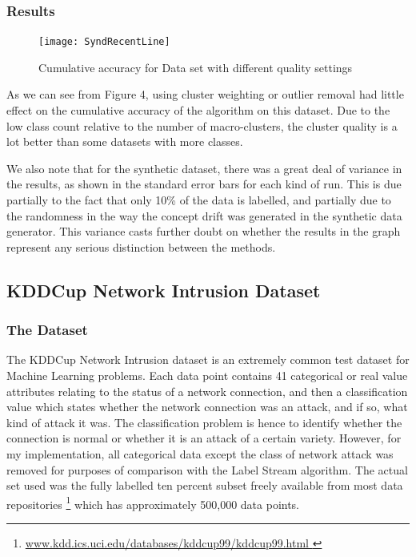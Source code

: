 \documentclass[12pt,a4paper,oneside]{report}
\begin{document}
\subsubsection*{Results}
\begin{figure}
	\texttt{[image: SyndRecentLine]}
	\caption{Cumulative accuracy for Data set with different quality settings}
\end{figure}

As we can see from Figure 4, using cluster weighting or outlier removal had little effect on the cumulative accuracy of the algorithm on this dataset.  Due to the low class count relative to the number of macro-clusters, the cluster quality is a lot better than some datasets with more classes. 

We also note that for the synthetic dataset, there was a great deal of variance in the results, as shown in the standard error bars for each kind of run. This is due partially to the fact that only 10\% of the data is labelled, and partially due to the randomness in the way the concept drift was generated in the synthetic data generator. This variance casts further doubt on whether the results in the graph represent any serious distinction between the methods. 

\subsection*{KDDCup Network Intrusion Dataset}
\subsubsection*{The Dataset}

The KDDCup Network Intrusion dataset is an extremely common test dataset for Machine Learning problems. Each data point contains 41 categorical or real value attributes relating to the status of a network connection, and then a classification value which states whether the network connection was an attack, and if so, what kind of attack it was. The classification problem is hence to identify whether the connection is normal or whether it is an attack of a certain variety. However, for my implementation, all categorical data except the class of network attack was removed for purposes of comparison with the Label Stream algorithm. The actual set used was the fully labelled ten percent subset freely available from most data repositories \footnote{\url{ www.kdd.ics.uci.edu/databases/kddcup99/kddcup99.html } } which has approximately 500,000 data points.    
\end{document}
